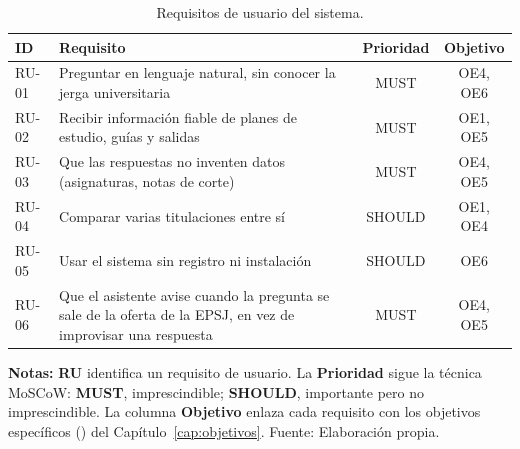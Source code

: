 \begin{table}[htbp]
  \centering
  \small
  \caption{Requisitos de usuario del sistema.}
  \label{tab:requisitos_usuario}
  \begin{tabularx}{\textwidth}{@{}l Y c c@{}}
    \toprule
    \textbf{ID} & \textbf{Requisito}                                                 & \textbf{Prioridad} & \textbf{Objetivo} \\
    \midrule
    RU-01       & Preguntar en lenguaje natural, sin conocer la jerga universitaria  & MUST               & OE4, OE6          \\
    RU-02       & Recibir información fiable de planes de estudio, guías y salidas   & MUST               & OE1, OE5          \\
    RU-03       & Que las respuestas no inventen datos (asignaturas, notas de corte) & MUST               & OE4, OE5          \\
    RU-04       & Comparar varias titulaciones entre sí                              & SHOULD             & OE1, OE4          \\
    RU-05       & Usar el sistema sin registro ni instalación                        & SHOULD             & OE6               \\
    RU-06       & Que el asistente avise cuando la pregunta se sale de la oferta de la EPSJ, en vez de improvisar una respuesta & MUST & OE4, OE5          \\
    \bottomrule
  \end{tabularx}
  \begin{minipage}{0.95\textwidth}
    \vspace{4pt}
    \tiny
    \textbf{Notas:} \textbf{RU} identifica un requisito de usuario. La \textbf{Prioridad} sigue la técnica MoSCoW: \textbf{MUST}, imprescindible; \textbf{SHOULD}, importante pero no imprescindible. La columna \textbf{Objetivo} enlaza cada requisito con los objetivos específicos (\textbf{}) del Capítulo~\ref{cap:objetivos}. Fuente: Elaboración propia.
  \end{minipage}
\end{table}
